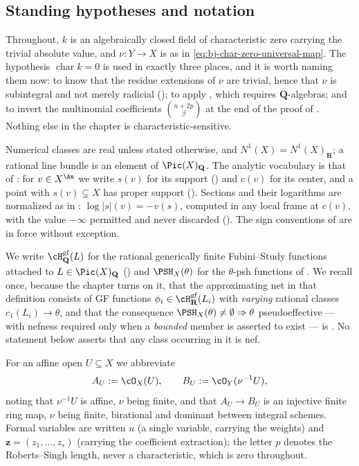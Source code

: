 \subsection{Standing hypotheses and notation}
\label{sec:ch44-hypotheses}

Throughout, $k$ is an algebraically closed field of characteristic zero
carrying the trivial absolute value, and $\nu:Y\to X$ is as in
\eqref{eq:bj-char-zero-universal-map}.  The hypothesis
$\operatorname{char}k=0$ is used in exactly three places, and it is worth
naming them now: to know that the residue extensions of $\nu$ are trivial,
hence that $\nu$ is subintegral and not merely radicial
(); to apply
, which requires $\mathbf Q$-algebras; and to
invert the multinomial coefficients $\binom{n+2p}{\beta}$ at the end of
the proof of .  Nothing else in the
chapter is characteristic-sensitive.

Numerical classes are real unless stated otherwise, and
$N^1(X)=N^1(X)_{\mathbf R}$; a rational line bundle is an element of
$\Pic(X)_{\mathbf Q}$.  The analytic vocabulary is that of
: for $v\in X^{\An}$ we write $s(v)$
for its support () and $c(v)$ for its center, and a
point with $s(v)\subsetneq X$ has proper support
().  Sections and their logarithms are
normalized as in : $\log|s|(v)=-v(s)$, computed in
any local frame at $c(v)$, with the value $-\infty$ permitted and never
discarded ().  The sign conventions of
 are in force without exception.

We write $\cH^{\mathrm{gf}}_{\mathbf Q}(L)$ for the rational generically
finite Fubini--Study functions attached to $L\in\Pic(X)_{\mathbf Q}$
() and $\PSH_X(\theta)$ for the $\theta$-psh
functions of .  We recall once, because the chapter turns
on it, that the approximating net in that definition consists of GF
functions $\phi_i\in\cH^{\mathrm{gf}}_{\mathbf R}(L_i)$ with
\emph{varying} rational classes $c_1(L_i)\to\theta$, and that the
consequence $\PSH_X(\theta)\ne\emptyset\Rightarrow\theta$ pseudoeffective
--- with nefness required only when a \emph{bounded} member is asserted to
exist --- is .  No statement below asserts that
any class occurring in it is nef.

For an affine open $U\subseteq X$ we abbreviate
\[
 A_U:=\cO_X(U),
 \qquad
 B_U:=\cO_Y(\nu^{-1}U),
\]
noting that $\nu^{-1}U$ is affine, $\nu$ being finite, and that
$A_U\to B_U$ is an injective finite ring map, $\nu$ being finite,
birational and dominant between integral schemes.  Formal variables are
written $u$ (a single variable, carrying the weights) and
$\mathbf z=(z_1,\ldots,z_s)$ (carrying the coefficient extraction); the
letter $p$ denotes the Roberts--Singh length, never a characteristic,
which is zero throughout.

